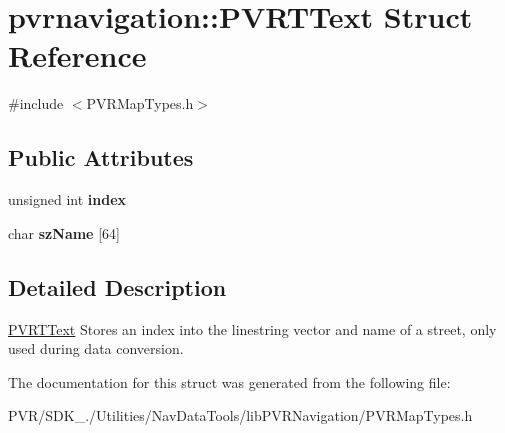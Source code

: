 \hypertarget{structpvrnavigation_1_1_p_v_r_t_text}{\section{pvrnavigation\+:\+:P\+V\+R\+T\+Text Struct Reference}
\label{structpvrnavigation_1_1_p_v_r_t_text}
}


{\ttfamily \#include $<$P\+V\+R\+Map\+Types.\+h$>$}

\subsection*{Public Attributes}
\begin{DoxyCompactItemize}
\item 
\hypertarget{structpvrnavigation_1_1_p_v_r_t_text_a998646a10e50862daca88f0be71fcbd6}{unsigned int {\bfseries index}}\label{structpvrnavigation_1_1_p_v_r_t_text_a998646a10e50862daca88f0be71fcbd6}

\item 
\hypertarget{structpvrnavigation_1_1_p_v_r_t_text_ae3961189706989acabf2ad8bc80c4be7}{char {\bfseries sz\+Name} \mbox{[}64\mbox{]}}\label{structpvrnavigation_1_1_p_v_r_t_text_ae3961189706989acabf2ad8bc80c4be7}

\end{DoxyCompactItemize}


\subsection{Detailed Description}


  \hyperlink{structpvrnavigation_1_1_p_v_r_t_text}{P\+V\+R\+T\+Text}  Stores an index into the linestring vector and name of a street, only used during data conversion. 

The documentation for this struct was generated from the following file\+:\begin{DoxyCompactItemize}
\item 
P\+V\+R/\+S\+D\+K\+\_./\+Utilities/\+Nav\+Data\+Tools/lib\+P\+V\+R\+Navigation/P\+V\+R\+Map\+Types.\+h\end{DoxyCompactItemize}
